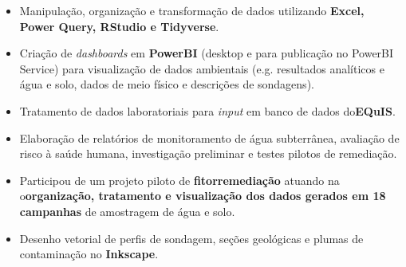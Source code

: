 \documentclass[10pt,a4paper,ragged2e,academicons]{altacv}
\begin{document}
\tagline{}

\begin{fullwidth}
\makecvheader
\end{fullwidth}




\begin{itemize}
    \item Manipulação, organização e transformação de dados utilizando \textbf{Excel, Power Query, RStudio e Tidyverse}.
    \item Criação de \textit{dashboards} em \textbf{PowerBI} (desktop e para publicação no PowerBI Service) para visualização de dados ambientais (e.g. resultados analíticos e água e solo, dados de meio físico e descrições de sondagens).
    \item Tratamento de dados laboratoriais para \textit{input} em banco de dados do\textbf{EQuIS}\faRegistered.
    \item Elaboração de relatórios de monitoramento de água subterrânea, avaliação de risco à saúde humana, investigação preliminar e testes pilotos de remediação.
    \item Participou de um projeto piloto de \textbf{fitorremediação} atuando na o\textbf{organização, tratamento e visualização dos dados gerados em 18 campanhas} de amostragem de água e solo.
    \item Desenho vetorial de perfis de sondagem, seções geológicas e plumas de contaminação no \textbf{Inkscape}.

\end{itemize}
\divider
\end{document}
